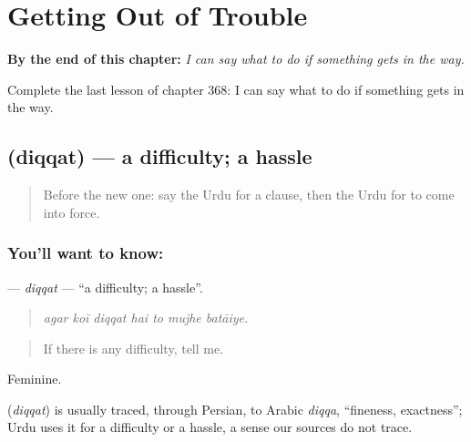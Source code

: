 
\chapter{Getting Out of Trouble}
\label{ch:ur-getting-out-of-trouble}

\begin{chapteropening}
\textbf{By the end of this chapter:} \emph{I can say what to do if something gets in the way.}

Complete the last lesson of chapter 368: I can say what to do if something gets in the way.
\end{chapteropening}

\section[\texorpdfstring{\ur{دقت} (diqqat)}{دقت (diqqat)}]{ (diqqat) — a difficulty; a hassle}

\label{lesson:UR-C368-diqqat}



\begin{quote}
Before the new one: say the Urdu for a clause, then the Urdu for to come into force.
\end{quote}

\subsection*{You'll want to know: }
\textbf{} — \emph{diqqat} — \textquotedblleft{}a difficulty; a hassle\textquotedblright{}.

\begin{quote}
      
\end{quote}

\begin{quote}
\emph{agar koī diqqat hai to mujhe batāiye.}
\end{quote}

\begin{quote}
If there is any difficulty, tell me.
\end{quote}

Feminine.

\begin{cousinweb}
\textbf{} (\emph{diqqat}) is usually traced, through Persian, to Arabic \emph{diqqa}, \textquotedblleft{}fineness, exactness\textquotedblright{}; Urdu uses it for a difficulty or a hassle, a sense our sources do not trace.
\end{cousinweb}

